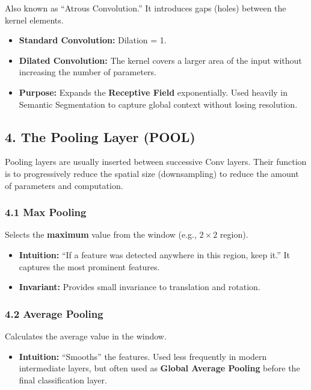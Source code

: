 \documentclass[
  italian,
  11pt,
]{article}
\providecommand{\tightlist}{%
  \setlength{\itemsep}{0pt}\setlength{\parskip}{0pt}}
\begin{document}
Also known as ``Atrous Convolution.'' It introduces gaps (holes) between
the kernel elements.

\begin{itemize}
\item
  \textbf{Standard Convolution:} Dilation = 1.
\item
  \textbf{Dilated Convolution:} The kernel covers a larger area of the
  input without increasing the number of parameters.
\item
  \textbf{Purpose:} Expands the \textbf{Receptive Field} exponentially.
  Used heavily in Semantic Segmentation to capture global context
  without losing resolution.
\end{itemize}

\subsection{4. The Pooling Layer (POOL)}\label{the-pooling-layer-pool}

Pooling layers are usually inserted between successive Conv layers.
Their function is to progressively reduce the spatial size
(downsampling) to reduce the amount of parameters and computation.

\subsubsection{4.1 Max Pooling}\label{max-pooling}

Selects the \textbf{maximum} value from the window (e.g., \(2 \times 2\)
region).

\begin{itemize}
\item
  \textbf{Intuition:} ``If a feature was detected anywhere in this
  region, keep it.'' It captures the most prominent features.
\item
  \textbf{Invariant:} Provides small invariance to translation and
  rotation.
\end{itemize}

\subsubsection{4.2 Average Pooling}\label{average-pooling}

Calculates the average value in the window.

\begin{itemize}
\tightlist
\item
  \textbf{Intuition:} ``Smooths'' the features. Used less frequently in
  modern intermediate layers, but often used as \textbf{Global Average
  Pooling} before the final classification layer.
\end{itemize}
\end{document}
